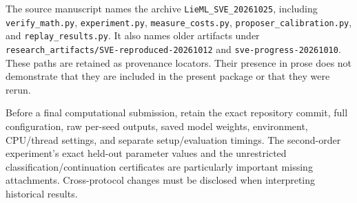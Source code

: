 \documentclass[11pt,a4paper,oneside]{report}
\numberwithin{equation}{chapter}
\DeclareRobustCommand{\code}[1]{\nolinkurl{#1}}
\begin{document}
{\raggedright The source manuscript \cite{projectdraft} names the archive \code{LieML_SVE_20261025}, including \code{verify_math.py}, \code{experiment.py}, \code{measure_costs.py}, \code{proposer_calibration.py}, and \code{replay_results.py}. It also names older artifacts under \code{research_artifacts/SVE-reproduced-20261012} and \code{sve-progress-20261010}. These paths are retained as provenance locators. Their presence in prose does not demonstrate that they are included in the present package or that they were rerun.\par}

Before a final computational submission, retain the exact repository commit, full configuration, raw per-seed outputs, saved model weights, environment, CPU/thread settings, and separate setup/evaluation timings. The second-order experiment's exact held-out parameter values and the unrestricted classification/continuation certificates are particularly important missing attachments. Cross-protocol changes must be disclosed when interpreting historical results.
\end{document}
